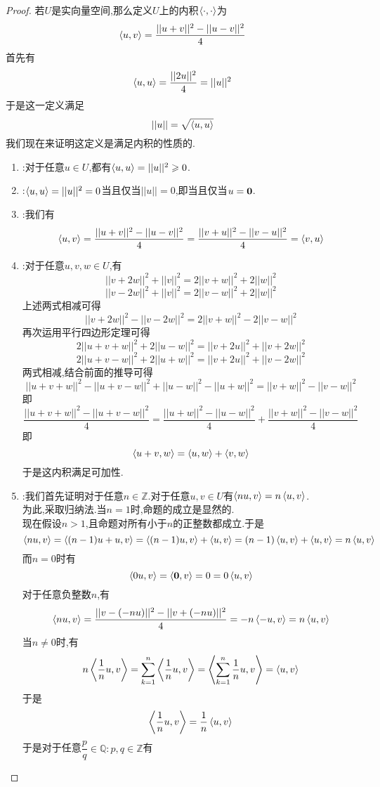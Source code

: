 \documentclass{ctexart}
\begin{document}
\begin{proof}
    若$U$是实向量空间,那么定义$U$上的内积$\left\langle{\cdot},{\cdot}\right\rangle$为
    \[\left\langle{u},{v}\right\rangle=\dfrac{||u+v||^2-||u-v||^2}{4}\]
    首先有
    \[\left\langle{u},{u}\right\rangle=\dfrac{||2u||^2}{4}=||u||^2\]
    于是这一定义满足
    \[||u||=\sqrt{\left\langle{u},{u}\right\rangle}\]
    我们现在来证明这定义是满足内积的性质的.
    \begin{enumerate}[label=\tbf{(\arabic*)}]
        \item {}:对于任意$u\in U$,都有$\left\langle{u},{u}\right\rangle=||u||^2\geqslant0$.
        \item {}:$\left\langle{u},{u}\right\rangle=||u||^2=0$当且仅当$||u||=0$,即当且仅当$u=\mathbf0$.
        \item {}:我们有
            \[\left\langle{u},{v}\right\rangle=\dfrac{||u+v||^2-||u-v||^2}{4}=\dfrac{||v+u||^2-||v-u||^2}{4}=\left\langle{v},{u}\right\rangle\]
        \item {}:对于任意$u,v,w\in U$,有
            \[||v+2w||^2+||v||^2=2||v+w||^2+2||w||^2\]
            \[||v-2w||^2+||v||^2=2||v-w||^2+2||w||^2\]
            上述两式相减可得
            \[||v+2w||^2-||v-2w||^2=2||v+w||^2-2||v-w||^2\]
            再次运用平行四边形定理可得
            \[2||u+v+w||^2+2||u-w||^2=||v+2u||^2+||v+2w||^2\]
            \[2||u+v-w||^2+2||u+w||^2=||v+2u||^2+||v-2w||^2\]
            两式相减,结合前面的推导可得
            \[||u+v+w||^2-||u+v-w||^2+||u-w||^2-||u+w||^2=||v+w||^2-||v-w||^2\]
            即
            \[\dfrac{||u+v+w||^2-||u+v-w||^2}{4}=\dfrac{||u+w||^2-||u-w||^2}{4}+\dfrac{||v+w||^2-||v-w||^2}{4}\]
            即
            \[\left\langle{u+v},{w}\right\rangle=\left\langle{u},{w}\right\rangle+\left\langle{v},{w}\right\rangle\]
            于是这内积满足可加性.
        \item {}:我们首先证明对于任意$n\in\mathbb{Z}$.对于任意$u,v\in U$有$\left\langle{nu},{v}\right\rangle=n\left\langle{u},{v}\right\rangle$.\\
            为此,采取归纳法.当$n=1$时,命题的成立是显然的.\\
            现在假设$n>1$,且命题对所有小于$n$的正整数都成立.于是
            \[\left\langle{nu},{v}\right\rangle=\left\langle{(n-1)u+u},{v}\right\rangle=\left\langle{(n-1)u},{v}\right\rangle+\left\langle{u},{v}\right\rangle=(n-1)\left\langle{u},{v}\right\rangle+\left\langle{u},{v}\right\rangle=n\left\langle{u},{v}\right\rangle\]
            而$n=0$时有
            \[\left\langle{0u},{v}\right\rangle=\left\langle{\mathbf0},{v}\right\rangle=0=0\left\langle{u},{v}\right\rangle\]
            对于任意负整数$n$,有
            \[\left\langle{nu},{v}\right\rangle=\dfrac{||v-(-nu)||^2-||v+(-nu)||^2}{4}=-n\left\langle{-u},{v}\right\rangle=n\left\langle{u},{v}\right\rangle\]
            当$n\neq0$时,有
            \[n\left\langle{\dfrac1nu},{v}\right\rangle=\sum_{k=1}^{n}\left\langle{\dfrac1nu},{v}\right\rangle=\left\langle{\sum_{k=1}^{n}\dfrac1nu},{v}\right\rangle=\left\langle{u},{v}\right\rangle\]
            于是
            \[\left\langle{\dfrac1nu},{v}\right\rangle=\dfrac{1}{n}\left\langle{u},{v}\right\rangle\]
            于是对于任意$\dfrac pq\in\mathbb{Q}:p,q\in\mathbb{Z}$有

\end{enumerate}
\end{proof}
\end{document}
